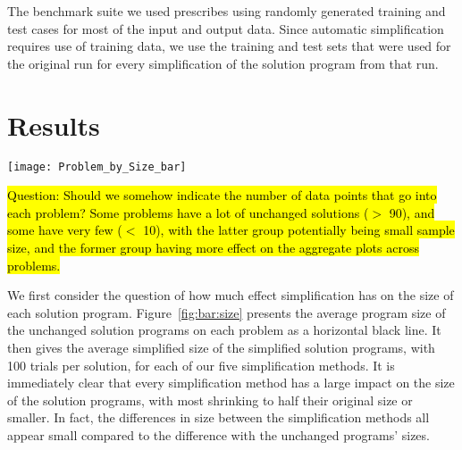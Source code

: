The benchmark suite we used prescribes using randomly generated training and test cases for most of the input and output data. Since automatic simplification requires use of training data, we use the training and test sets that were used for the original run for every simplification of the solution program from that run.



\section{Results}
\label{sec:results}

\begin{figure*}[t] %
\centering
\texttt{[image: Problem\_by\_Size\_bar]} %
\caption{For each problem, we plot the average program size of programs produced by different simplification methods, as well as the average program sizes of the unchanged programs as black horizontal bars. Remember that each simplification method does repeated trials using the same set of unchanged programs, and therefore has the same opportunities for simplification as the other methods. }
\label{fig:bar:size}
\end{figure*}

\hl{Question: Should we somehow indicate the number of data points that go into each problem? Some problems have a lot of unchanged solutions ($>$ 90), and some have very few ($<$ 10), with the latter group potentially being small sample size, and the former group having more effect on the aggregate plots across problems.}

We first consider the question of how much effect simplification has on the size of each solution program. Figure~\ref{fig:bar:size} presents the average program size of the unchanged solution programs on each problem as a horizontal black line. It then gives the average simplified size of the simplified solution programs, with 100 trials per solution, for each of our five simplification methods. It is immediately clear that every simplification method has a large impact on the size of the solution programs, with most shrinking to half their original size or smaller. In fact, the differences in size between the simplification methods all appear small compared to the difference with the unchanged programs' sizes.

